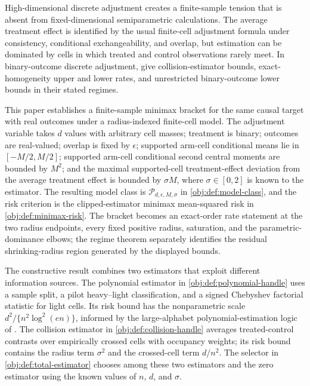 \documentclass[11pt]{article}
\begin{document}
High-dimensional discrete adjustment creates a finite-sample tension that is absent from fixed-dimensional semiparametric calculations. The average treatment effect is identified by the usual finite-cell adjustment formula under consistency, conditional exchangeability, and overlap, but estimation can be dominated by cells in which treated and control observations rarely meet. In binary-outcome discrete adjustment, \citet{ZengBalakrishnanHanKennedy2024} give collision-estimator bounds, exact-homogeneity upper and lower rates, and unrestricted binary-outcome lower bounds in their stated regimes.

This paper establishes a finite-sample minimax bracket for the same causal target with real outcomes under a radius-indexed finite-cell model. The adjustment variable takes \(d\) values with arbitrary cell masses; treatment is binary; outcomes are real-valued; overlap is fixed by \(\epsilon\); supported arm-cell conditional means lie in \([-M/2,M/2]\); supported arm-cell conditional second central moments are bounded by \(M^2\); and the maximal supported-cell treatment-effect deviation from the average treatment effect is bounded by \(\sigma M\), where \(\sigma\in[0,2]\) is known to the estimator. The resulting model class is \(\mathcal P_{d,\epsilon,M,\sigma}\) in \cref{obj:def:model-class}, and the risk criterion is the clipped-estimator minimax mean-squared risk in \cref{obj:def:minimax-risk}. The bracket becomes an exact-order rate statement at the two radius endpoints, every fixed positive radius, saturation, and the parametric-dominance elbows; the regime theorem separately identifies the residual shrinking-radius region generated by the displayed bounds.

The constructive result combines two estimators that exploit different information sources. The polynomial estimator in \cref{obj:def:polynomial-handle} uses a sample split, a pilot heavy--light classification, and a signed Chebyshev factorial statistic for light cells. Its risk bound has the nonparametric scale \(d^2/\{n^2\log^2(en)\}\), informed by the large-alphabet polynomial-estimation logic of \citet{JiaoVenkatHanWeissman2015,WuYang2016Entropy}. The collision estimator in \cref{obj:def:collision-handle} averages treated-control contrasts over empirically crossed cells with occupancy weights; its risk bound contains the radius term \(\sigma^2\) and the crossed-cell term \(d/n^2\). The selector in \cref{obj:def:total-estimator} chooses among these two estimators and the zero estimator using the known values of \(n\), \(d\), and \(\sigma\).
\end{document}
